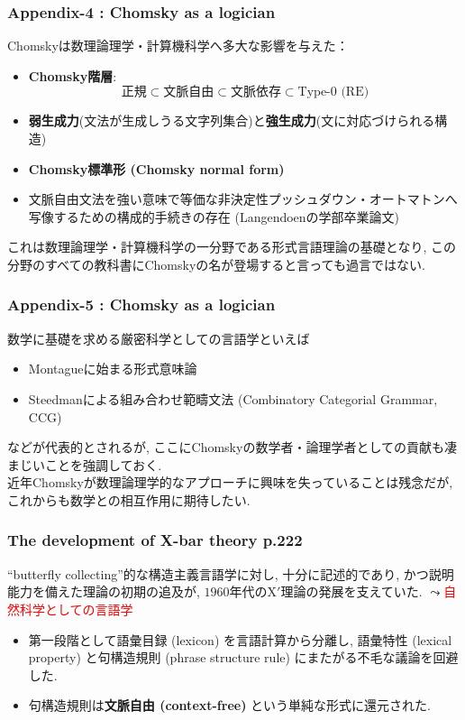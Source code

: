 \documentclass[dvipdfmx, xcolor={dvipsnames},12pt]{beamer}
\begin{document}
\begin{frame}
\frametitle{Appendix-4 : Chomsky as a logician}
Chomskyは数理論理学・計算機科学へ多大な影響を与えた：

\begin{itemize}
\item \textbf{Chomsky階層}:
\[
\text{正規} \subset \text{文脈自由} \subset \text{文脈依存} \subset \text{Type-0 (RE)}
\]
\item \textbf{弱生成力}(文法が生成しうる文字列集合)と\textbf{強生成力}(文に対応づけられる構造)
\item \textbf{Chomsky標準形 (Chomsky normal form)}
\item 文脈自由文法を強い意味で等価な非決定性プッシュダウン・オートマトンへ写像するための構成的手続きの存在 (Langendoenの学部卒業論文)
\end{itemize}

これは数理論理学・計算機科学の一分野である形式言語理論の基礎となり,  
この分野のすべての教科書にChomskyの名が登場すると言っても過言ではない.

\end{frame}

\begin{frame}
\frametitle{Appendix-5 : Chomsky as a logician}
数学に基礎を求める厳密科学としての言語学といえば

\begin{itemize}
\item Montagueに始まる形式意味論
\item Steedmanによる組み合わせ範疇文法 (Combinatory Categorial Grammar, CCG) 
\end{itemize}

などが代表的とされるが, ここにChomskyの数学者・論理学者としての貢献も凄まじいことを強調しておく.\\
\vspace{5pt}
近年Chomskyが数理論理学的なアプローチに興味を失っていること\cite{Chomsky2003}は残念だが, これからも数学との相互作用に期待したい.
\end{frame}


\begin{frame}
\frametitle{The development of X-bar theory p.222}
``butterfly collecting''的な構造主義言語学に対し, 十分に記述的であり, かつ説明能力を備えた理論の初期の追及が, $1960$年代のX$'$理論の発展を支えていた. 
$\leadsto$\textcolor{red}{自然科学としての言語学}
\vspace{1em}
\begin{itemize}
\item 第一段階として語彙目録 (lexicon) を言語計算から分離し, 語彙特性 (lexical property) と句構造規則 (phrase structure rule) にまたがる不毛な議論を回避した. 
\item 句構造規則は\textbf{文脈自由 (context-free)} という単純な形式に還元された.
\end{itemize}
\end{frame}
\end{document}
